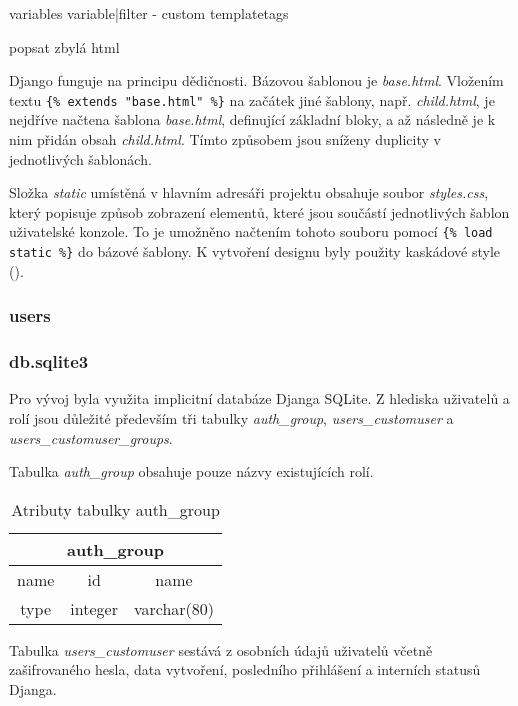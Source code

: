 {{ variables }}
{{ variable|filter }}
- custom templatetags

popsat zbylá html

Django funguje na principu dědičnosti. Bázovou šablonou je \textit{base.html}. Vložením textu \texttt{\{\% extends "base.html" \%\}} na začátek jiné šablony, např. \textit{child.html}, je nejdříve načtena šablona \textit{base.html}, definující základní bloky, a až následně je k nim přidán obsah \textit{child.html}. Tímto způsobem jsou sníženy duplicity v jednotlivých šablonách. 

Složka \textit{static} umístěná v hlavním adresáři projektu obsahuje soubor \textit{styles.css}, který popisuje způsob zobrazení elementů, které jsou součástí jednotlivých šablon uživatelské konzole. To je umožněno načtením tohoto souboru pomocí \texttt{\{\% load static \%\}} do bázové šablony. K vytvoření designu byly použity kaskádové style ().

\subsubsection{users}

\subsubsection{db.sqlite3}

Pro vývoj byla využita implicitní databáze Djanga SQLite. 
Z hlediska uživatelů a rolí jsou důležité především tři tabulky \textit{auth\_group}, \textit{users\_customuser} a \textit{users\_customuser\_groups}. 

Tabulka \textit{auth\_group} obsahuje pouze názvy existujících rolí.

\begin{table}[H]
\centering
\begin{tabular}{@{}|c|c|c|@{}}
\toprule
\multicolumn{3}{|c|}{auth\_group} \\ \midrule
name & id & name \\ \midrule
type & integer & varchar(80) \\ \bottomrule
\end{tabular}
\caption{Atributy tabulky auth\_group}
\label{tab:auth-group}
\end{table}

Tabulka \textit{users\_customuser} sestává z osobních údajů uživatelů včetně zašifrovaného hesla, data vytvoření, posledního přihlášení a interních statusů Djanga. 

